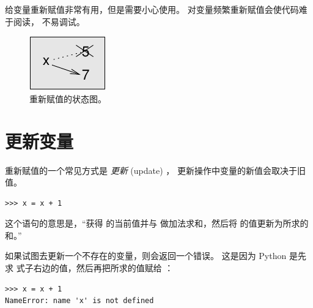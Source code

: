 给变量重新赋值非常有用，但是需要小心使用。 对变量频繁重新赋值会使代码难于阅读，
不易调试。

\begin{figure}
\centerline
{\includegraphics[scale=0.8]{../source/figs/assign2.pdf}}
\caption {重新赋值的状态图。}
\label{fig.assign2}
\end{figure}


\section{更新变量}
\label{update}

  
  


重新赋值的一个常见方式是 {\em 更新} (update) ， 更新操作中变量的新值会取决于旧值。


\begin{lstlisting}
>>> x = x + 1
\end{lstlisting}

%

这个语句的意思是，``获得  的当前值并与  做加法求和，然后将  的值更新为所求的和。''


如果试图去更新一个不存在的变量，则会返回一个错误。 这是因为 Python 是先求
式子右边的值，然后再把所求的值赋给 ：

\begin{lstlisting}
>>> x = x + 1
NameError: name 'x' is not defined
\end{lstlisting}

%

